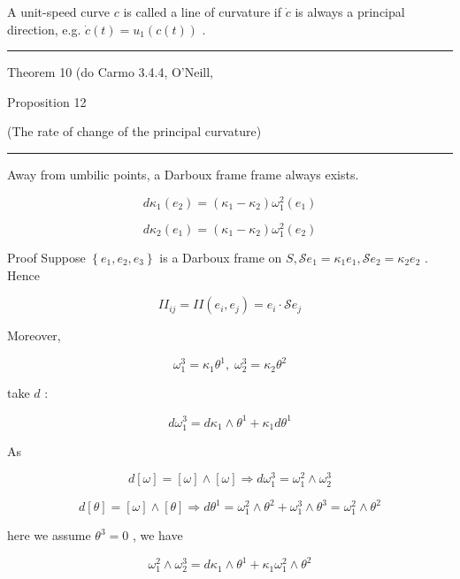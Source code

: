 \documentclass[lang=cn,a4paper,11pt,openany,twoside]{elegantbook}
\newcommand{\HRule}{\begin{center}\rule{0.9\linewidth}{0.2mm}\end{center}}
\begin{document}
A unit-speed curve \(c\) is called a line of curvature if \(\dot{c}\) is always a principal direction, e.g. \(\dot{c}\left( t\right)  = {u}_{1}\left( {c\left( t\right) }\right)\) .

\HRule

Theorem 10 (do Carmo 3.4.4, O'Neill,

Proposition 12

(The rate of change of the principal curvature)

\HRule

Away from umbilic points, a Darboux frame frame always exists.

\[
d{\kappa }_{1}\left( {e}_{2}\right)  = \left( {{\kappa }_{1} - {\kappa }_{2}}\right) {\omega }_{1}^{2}\left( {e}_{1}\right) \tag{10.1}
\]

\[
d{\kappa }_{2}\left( {e}_{1}\right)  = \left( {{\kappa }_{1} - {\kappa }_{2}}\right) {\omega }_{1}^{2}\left( {e}_{2}\right)
\]

Proof Suppose \(\left\{  {{e}_{1},{e}_{2},{e}_{3}}\right\}\) is a Darboux frame on \(S,\mathcal{S}{e}_{1} = {\kappa }_{1}{e}_{1},\mathcal{S}{e}_{2} = {\kappa }_{2}{e}_{2}\) . Hence

\[
I{I}_{ij} = {II}\left( {{e}_{i},{e}_{j}}\right)  = {e}_{i} \cdot  \mathcal{S}{e}_{j}
\]

Moreover,

\[
{\omega }_{1}^{3} = {\kappa }_{1}{\theta }^{1},\;{\omega }_{2}^{3} = {\kappa }_{2}{\theta }^{2} \tag{10.2}
\]

take \(d\) :

\[
d{\omega }_{1}^{3} = d{\kappa }_{1} \land  {\theta }^{1} + {\kappa }_{1}d{\theta }^{1}
\]

As

\[
d\left\lbrack  \omega \right\rbrack   = \left\lbrack  \omega \right\rbrack   \land  \left\lbrack  \omega \right\rbrack   \Rightarrow  d{\omega }_{1}^{3} = {\omega }_{1}^{2} \land  {\omega }_{2}^{3}
\]

\[
d\left\lbrack  \theta \right\rbrack   = \left\lbrack  \omega \right\rbrack   \land  \left\lbrack  \theta \right\rbrack   \Rightarrow  d{\theta }^{1} = {\omega }_{1}^{2} \land  {\theta }^{2} + {\omega }_{1}^{3} \land  {\theta }^{3} = {\omega }_{1}^{2} \land  {\theta }^{2}
\]

here we assume \({\theta }^{3} = 0\) , we have

\[
{\omega }_{1}^{2} \land  {\omega }_{2}^{3} = d{\kappa }_{1} \land  {\theta }^{1} + {\kappa }_{1}{\omega }_{1}^{2} \land  {\theta }^{2}
\]
\end{document}
